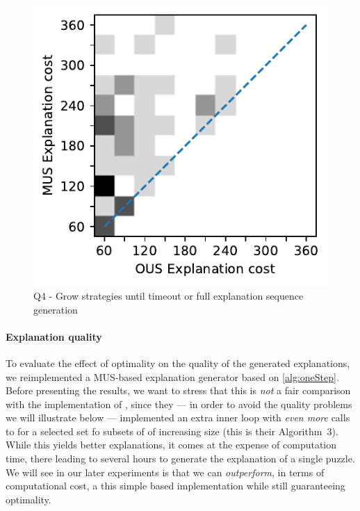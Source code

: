\begin{figure}[ht]
  \centering
  \includegraphics[width=0.7\columnwidth]{figures/rq1_heatmap.pdf}
  \caption{Q4 - Grow strategies until timeout or full explanation sequence generation}
  \label{fig:rq1_heatmap}
\end{figure}


\paragraph{Explanation quality} 
To evaluate the effect of optimality on the quality of the generated explanations, we reimplemented a MUS-based explanation generator based on \cref{alg:oneStep}. 
Before presenting the results, we want to stress that this is \emph{not} a fair comparison with the implementation of \citet{ecai/BogaertsGCG20}, since they --- in order to avoid the quality problems we will illustrate below --- implemented an extra inner loop with \emph{even more} calls to  for a selected set fo subsets of \formulac of increasing size (this is their Algorithm~3). 
While this yields better explanations, it comes at the expense of computation time, there leading to several hours to generate the explanation of a single puzzle. 
We will see in our later experiments is that we can \emph{outperform}, in terms of computational cost, a this simple  based implementation while still guaranteeing optimality. 

